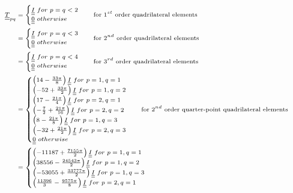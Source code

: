 \begin{equation}\label{paperA:eq:Tpq}
\scriptsize
\begin{split}
\underline{\underline{T}}_{pq}&=\begin{cases}
\underline{\underline{I}}\ for\ p=q<2\\
\underline{\underline{0}}\ otherwise
\end{cases}\quad \text{for $1^{st}$ order quadrilateral elements}\\
&=\begin{cases}
\underline{\underline{I}}\ for\ p=q<3\\
\underline{\underline{0}}\ otherwise
\end{cases}\quad \text{for $2^{nd}$ order quadrilateral elements}\\
&=\begin{cases}
\underline{\underline{I}}\ for\ p=q<4\\
\underline{\underline{0}}\ otherwise
\end{cases}\quad \text{for $3^{rd}$ order quadrilateral elements}\\
&=\begin{cases}
\left(14-\frac{33\pi}{8}\right)\underline{\underline{I}}\ for\ p=1,q=1\\
\left(-52+\frac{33\pi}{2}\right)\underline{\underline{I}}\ for\ p=1,q=2\\
\left(17-\frac{21\pi}{4}\right)\underline{\underline{I}}\ for\ p=2,q=1\\
\left(-\frac{7}{2}+\frac{21\pi}{16}\right)\underline{\underline{I}}\ for\ p=2,q=2\\
\left(8-\frac{21\pi}{8}\right)\underline{\underline{I}}\ for\ p=1,q=3\\
\left(-32+\frac{21\pi}{2}\right)\underline{\underline{I}}\ for\ p=2,q=3\\
\underline{\underline{0}}\ otherwise
\end{cases}\quad \text{for $2^{nd}$ order quarter-point quadrilateral elements}\\
&=\begin{cases}
\left(-11187+\frac{7155\pi}{2}\right)\underline{\underline{I}}\ for\ p=1,q=1\\
\left(38556-\frac{24543\pi}{2}\right)\underline{\underline{I}}\ for\ p=1,q=2\\
\left(-53055+\frac{33777\pi}{2}\right)\underline{\underline{I}}\ for\ p=1,q=3\\
\left(\frac{11396}{3}-\frac{9575\pi}{8}\right)\underline{\underline{I}}\ for\ p=2,q=1\\

\end{cases}
\end{split}
\end{equation}
